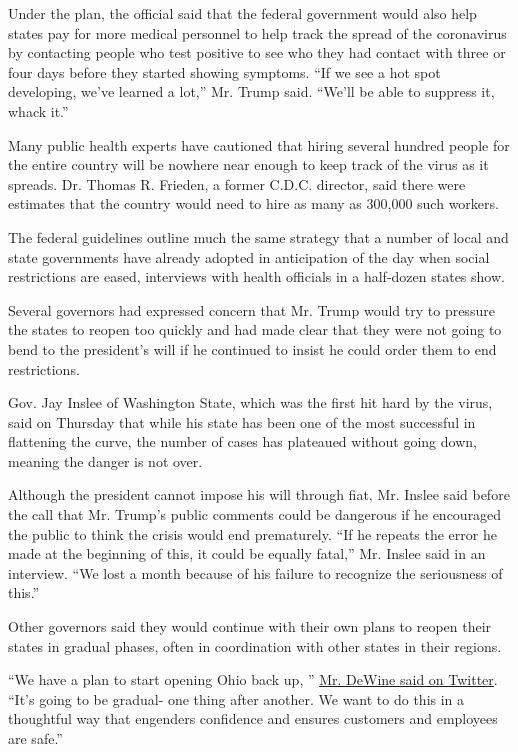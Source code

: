Under the plan, the official said that the federal government would also
help states pay for more medical personnel to help track the spread of
the coronavirus by contacting people who test positive to see who they
had contact with three or four days before they started showing
symptoms. ``If we see a hot spot developing, we've learned a lot,'' Mr.
Trump said. ``We'll be able to suppress it, whack it.''

Many public health experts have cautioned that hiring several hundred
people for the entire country will be nowhere near enough to keep track
of the virus as it spreads. Dr. Thomas R. Frieden, a former C.D.C.
director, said there were estimates that the country would need to hire
as many as 300,000 such workers.

The federal guidelines outline much the same strategy that a number of
local and state governments have already adopted in anticipation of the
day when social restrictions are eased, interviews with health officials
in a half-dozen states show.

Several governors had expressed concern that Mr. Trump would try to
pressure the states to reopen too quickly and had made clear that they
were not going to bend to the president's will if he continued to insist
he could order them to end restrictions.

Gov. Jay Inslee of Washington State, which was the first hit hard by the
virus, said on Thursday that while his state has been one of the most
successful in flattening the curve, the number of cases has plateaued
without going down, meaning the danger is not over.

Although the president cannot impose his will through fiat, Mr. Inslee
said before the call that Mr. Trump's public comments could be dangerous
if he encouraged the public to think the crisis would end prematurely.
``If he repeats the error he made at the beginning of this, it could be
equally fatal,'' Mr. Inslee said in an interview. ``We lost a month
because of his failure to recognize the seriousness of this.''

Other governors said they would continue with their own plans to reopen
their states in gradual phases, often in coordination with other states
in their regions.

``We have a plan to start opening Ohio back up, ''
\href{https://twitter.com/GovMikeDeWine/status/1250861666578960389?s=20}{Mr.
DeWine said on Twitter}. ``It's going to be gradual- one thing after
another. We want to do this in a thoughtful way that engenders
confidence and ensures customers and employees are safe.''

